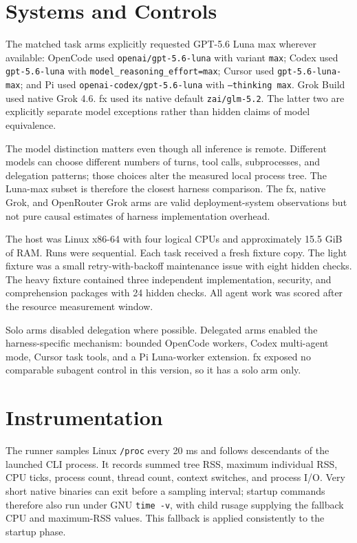 \documentclass[11pt]{article}
\begin{document}
\section{Systems and Controls}

The matched task arms explicitly requested GPT-5.6 Luna max wherever available:
OpenCode used \texttt{openai/gpt-5.6-luna} with variant \texttt{max}; Codex used
\texttt{gpt-5.6-luna} with \texttt{model\_reasoning\_effort=max}; Cursor used
\texttt{gpt-5.6-luna-max}; and Pi used \texttt{openai-codex/gpt-5.6-luna} with
\texttt{--thinking max}. Grok Build used native Grok 4.6. fx used its native
default \texttt{zai/glm-5.2}. The latter two are explicitly separate model
exceptions rather than hidden claims of model equivalence.

The model distinction matters even though all inference is remote. Different
models can choose different numbers of turns, tool calls, subprocesses, and
delegation patterns; those choices alter the measured local process tree. The
Luna-max subset is therefore the closest harness comparison. The fx, native
Grok, and OpenRouter Grok arms are valid deployment-system observations but not
pure causal estimates of harness implementation overhead.

The host was Linux x86-64 with four logical CPUs and approximately 15.5 GiB of
RAM. Runs were sequential. Each task received a fresh fixture copy. The light
fixture was a small retry-with-backoff maintenance issue with eight hidden
checks. The heavy fixture contained three independent implementation, security,
and comprehension packages with 24 hidden checks. All agent work was scored
after the resource measurement window.

Solo arms disabled delegation where possible. Delegated arms enabled the
harness-specific mechanism: bounded OpenCode workers, Codex multi-agent mode,
Cursor task tools, and a Pi Luna-worker extension. fx exposed no comparable
subagent control in this version, so it has a solo arm only.

\section{Instrumentation}

The runner samples Linux \texttt{/proc} every 20 ms and follows descendants of
the launched CLI process. It records summed tree RSS, maximum individual RSS,
CPU ticks, process count, thread count, context switches, and process I/O. Very
short native binaries can exit before a sampling interval; startup commands
therefore also run under GNU \texttt{time -v}, with child rusage supplying the
fallback CPU and maximum-RSS values. This fallback is applied consistently to
the startup phase.
\end{document}
